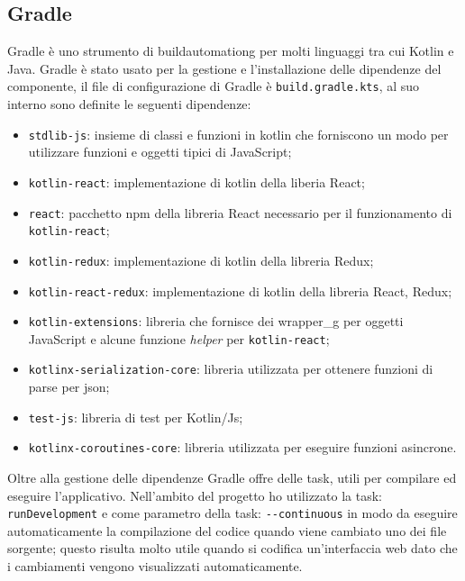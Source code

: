 \subsection{Gradle}
Gradle è uno strumento di \gls{buildautomationg} per molti linguaggi tra cui Kotlin e Java. Gradle è stato usato per la gestione e l'installazione delle dipendenze del componente, il file di configurazione di Gradle è \verb|build.gradle.kts|, al suo interno sono definite le seguenti dipendenze:
\begin{itemize}
	\item \verb|stdlib-js|: insieme di classi e funzioni in kotlin che forniscono un modo per utilizzare funzioni e oggetti tipici di JavaScript;
	
	\item \verb|kotlin-react|: implementazione di kotlin della liberia React;
	
	\item \verb|react|: pacchetto npm della libreria React necessario per il funzionamento di \verb|kotlin-react|;
	
	\item \verb|kotlin-redux|: implementazione di kotlin della libreria Redux;
	
	\item \verb|kotlin-react-redux|: implementazione di kotlin della libreria React, Redux;
	
	\item \verb|kotlin-extensions|: libreria che fornisce dei \gls{wrapper_g} per oggetti JavaScript e alcune funzione \emph{helper} per \verb|kotlin-react|;
	
	\item \verb|kotlinx-serialization-core|: libreria utilizzata per ottenere funzioni di parse per json;
	
	\item \verb|test-js|: libreria di test per Kotlin/Js;
	
	\item \verb|kotlinx-coroutines-core|: libreria utilizzata per eseguire funzioni asincrone.
\end{itemize}
\noindent
Oltre alla gestione delle dipendenze Gradle offre delle task, utili per compilare ed eseguire l'applicativo. Nell'ambito del progetto ho utilizzato la task: \verb|runDevelopment| e come parametro della task: \verb|--continuous| in modo da eseguire automaticamente la compilazione del codice quando viene cambiato uno dei file sorgente; questo risulta molto utile quando si codifica un'interfaccia web dato che i cambiamenti vengono visualizzati automaticamente.

